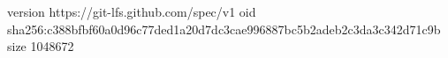 version https://git-lfs.github.com/spec/v1
oid sha256:c388bfbf60a0d96c77ded1a20d7dc3cae996887bc5b2adeb2c3da3c342d71c9b
size 1048672
